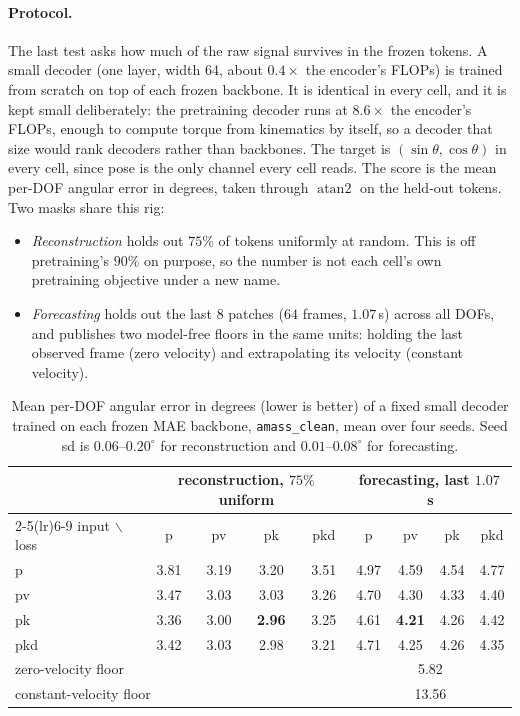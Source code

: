 \paragraph{Protocol.} The last test asks how much of the raw signal survives in the frozen
tokens. A small decoder (one layer, width $64$, about $0.4\times$ the encoder's FLOPs) is
trained from scratch on top of each frozen backbone. It is identical in every cell, and it
is kept small deliberately: the pretraining decoder runs at $8.6\times$ the encoder's FLOPs,
enough to compute torque from kinematics by itself, so a decoder that size would rank
decoders rather than backbones. The target is $(\sin\theta,\cos\theta)$ in every cell,
since pose is the only channel every cell reads. The score is the mean per-DOF angular
error in degrees, taken through $\operatorname{atan2}$ on the held-out tokens. Two masks
share this rig:
\begin{itemize}
\item \emph{Reconstruction} holds out $75\%$ of tokens uniformly at random. This is off
  pretraining's $90\%$ on purpose, so the number is not each cell's own pretraining
  objective under a new name.
\item \emph{Forecasting} holds out the last $8$ patches ($64$ frames, $1.07$\,s) across all
  DOFs, and publishes two model-free floors in the same units: holding the last observed
  frame (zero velocity) and extrapolating its velocity (constant velocity).
\end{itemize}

\begin{table}[t]
\centering
\small
\begin{tabular}{lcccc@{\hspace{1.2em}}cccc}
\toprule
& \multicolumn{4}{c}{reconstruction, $75\%$ uniform} & \multicolumn{4}{c}{forecasting, last $1.07$\,s} \\
\cmidrule(lr){2-5}\cmidrule(lr){6-9}
input $\backslash$ loss & \textsf{p} & \textsf{pv} & \textsf{pk} & \textsf{pkd} & \textsf{p} & \textsf{pv} & \textsf{pk} & \textsf{pkd} \\
\midrule
\textsf{p}   & 3.81 & 3.19 & 3.20 & 3.51 & 4.97 & 4.59 & 4.54 & 4.77 \\
\textsf{pv}  & 3.47 & 3.03 & 3.03 & 3.26 & 4.70 & 4.30 & 4.33 & 4.40 \\
\textsf{pk}  & 3.36 & 3.00 & \textbf{2.96} & 3.25 & 4.61 & \textbf{4.21} & 4.26 & 4.42 \\
\textsf{pkd} & 3.42 & 3.03 & 2.98 & 3.21 & 4.71 & 4.25 & 4.26 & 4.35 \\
\midrule
\multicolumn{5}{l}{zero-velocity floor}     & \multicolumn{4}{c}{5.82} \\
\multicolumn{5}{l}{constant-velocity floor} & \multicolumn{4}{c}{13.56} \\
\bottomrule
\end{tabular}
\caption{Mean per-DOF angular error in degrees (lower is better) of a fixed small decoder
trained on each frozen MAE backbone, \texttt{amass\_clean}, mean over four seeds. Seed sd is
$0.06$--$0.20^\circ$ for reconstruction and $0.01$--$0.08^\circ$ for forecasting.}
\label{tab:exp-reconstruction}
\end{table}

